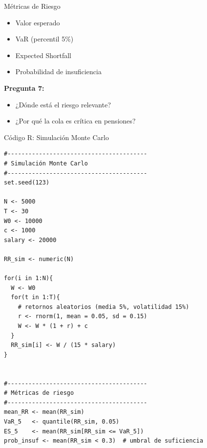 \documentclass{beamer}
\begin{document}
\begin{frame}{Métricas de Riesgo}

\begin{itemize}
\item Valor esperado
\item VaR (percentil 5\%)
\item Expected Shortfall
\item Probabilidad de insuficiencia
\end{itemize}

\vspace{0.4cm}

\textbf{Pregunta 7:}
\begin{itemize}
\item ¿Dónde está el riesgo relevante?
\item ¿Por qué la cola es crítica en pensiones?
\end{itemize}

\end{frame}
\begin{frame}[fragile]{Código R: Simulación Monte Carlo}
\tiny
\begin{verbatim}
#----------------------------------------
# Simulación Monte Carlo
#----------------------------------------
set.seed(123)

N <- 5000
T <- 30
W0 <- 10000
c <- 1000
salary <- 20000

RR_sim <- numeric(N)

for(i in 1:N){  
  W <- W0  
  for(t in 1:T){
    # retornos aleatorios (media 5%, volatilidad 15%)
    r <- rnorm(1, mean = 0.05, sd = 0.15)
    W <- W * (1 + r) + c
  }  
  RR_sim[i] <- W / (15 * salary)
}


#----------------------------------------
# Métricas de riesgo
#----------------------------------------
mean_RR <- mean(RR_sim)
VaR_5   <- quantile(RR_sim, 0.05)
ES_5    <- mean(RR_sim[RR_sim <= VaR_5])
prob_insuf <- mean(RR_sim < 0.3)  # umbral de suficiencia


\end{verbatim}
    
\end{frame}
\end{document}
